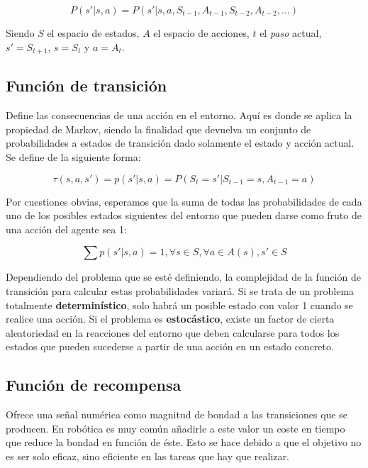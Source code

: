 \documentclass[11pt,fleqn]{book} %
\begin{document}
\begin{equation}
P(s'|s,a)=P(s'|s,a,S_{t-1},A_{t-1},S_{t-2},A_{t-2},...)
\end{equation}

Siendo $S$ el espacio de estados, $A$ el espacio de acciones, $t$ el \textit{paso} actual, $s'=S_{t+1}$, $s=S_t$ y $a=A_t$. \\

\subsection{Función de transición}

Define las consecuencias de una acción en el entorno. Aquí es donde se aplica la propiedad de Markov, siendo la finalidad que devuelva un conjunto de probabilidades a estados de transición dado solamente el estado y acción actual. Se define de la siguiente forma:

\begin{equation}
\tau(s,a,s')=p(s'|s,a)=P(S_t=s'|S_{t-1}=s,A_{t-1}=a)
\end{equation}

Por cuestiones obvias, esperamos que la suma de todas las probabilidades de cada uno de los posibles estados siguientes del entorno que pueden darse como fruto de una acción del agente sea 1:

\begin{equation}
\sum{p(s'|s,a)=1, \forall s \in S, \forall a \in A(s), s' \in S}
\end{equation}

Dependiendo del problema que se esté definiendo, la complejidad de la función de transición para calcular estas probabilidades variará. Si se trata de un problema totalmente \textbf{determinístico}, solo habrá un posible estado con valor 1 cuando se realice una acción. Si el problema es \textbf{estocástico}, existe un factor de cierta aleatoriedad en la reacciones del entorno que deben calcularse para todos los estados que pueden sucederse a partir de una acción en un estado concreto. \\

\subsection{Función de recompensa}

Ofrece una señal numérica como magnitud de bondad a las transiciones que se producen. En robótica es muy común añadirle a este valor un coste en tiempo que reduce la bondad en función de éste. Esto se hace debido a que el objetivo no es ser solo eficaz, sino eficiente en las tareas que hay que realizar. \\
\end{document}
